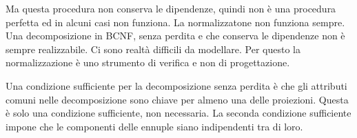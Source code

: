 \documentclass{article}
\numberwithin{equation}{subsection}
\begin{document}
Ma questa procedura non conserva le dipendenze, quindi non è una procedura perfetta ed in alcuni casi non funziona. La normalizzatone non funziona sempre. Una 
decomposizione in BCNF, senza perdita e che conserva le dipendenze non è sempre realizzabile. Ci sono realtà difficili da modellare. Per questo la normalizzazione è 
uno strumento di verifica e non di progettazione. 

Una condizione sufficiente per la decomposizione senza perdita è che gli attributi comuni nelle decomposizione sono chiave per almeno una delle proiezioni. Questa è 
solo una condizione sufficiente, non necessaria. La seconda condizione sufficiente impone che le componenti 
delle ennuple siano indipendenti tra di loro. 


\clearpage
\end{document}
